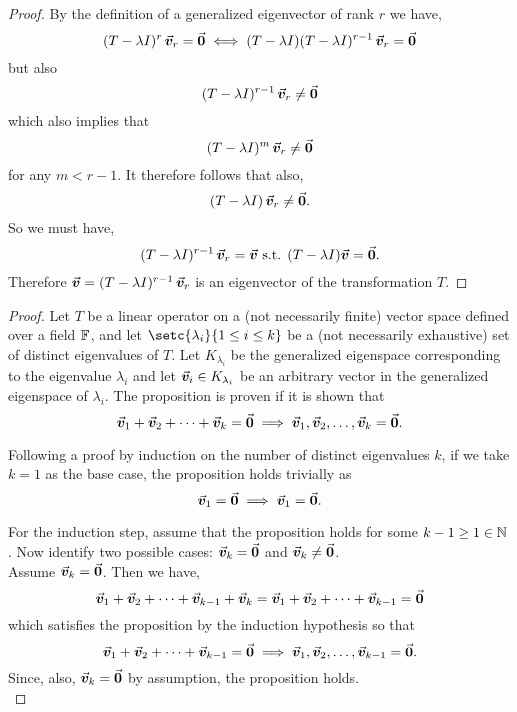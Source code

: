 \documentclass[../MathsNotesBase.tex]{subfiles}
\begin{document}
{		\bigskip
		\begin{proof}
			By the definition of a generalized eigenvector of rank $r$ we have,
			\[ (T - \lambda I)^r \, \vec{\bm{v}}_r = \vec{\bm{0}} \iff (T - \lambda I)(T - \lambda I)^{r-1} \, \vec{\bm{v}}_r = \vec{\bm{0}} \]
			but also
			\[ (T - \lambda I)^{r-1} \, \vec{\bm{v}}_r \neq \vec{\bm{0}} \]
			which also implies that
			\[ (T - \lambda I)^m \, \vec{\bm{v}}_r \neq \vec{\bm{0}} \]
			for any ${ m < r-1 }$. It therefore follows that also,
			\[ (T - \lambda I) \, \vec{\bm{v}}_r \neq \vec{\bm{0}}. \]
			So we must have,
			\[ (T - \lambda I)^{r-1} \, \vec{\bm{v}}_r = \vec{\bm{v}} \text{ s.t. } (T - \lambda I)\vec{\bm{v}} = \vec{\bm{0}}. \]
			Therefore ${ \vec{\bm{v}} = (T - \lambda I)^{r-1} \, \vec{\bm{v}}_r }$ is an eigenvector of the transformation $T$.
		\end{proof}
	
		\bigskip
		\begin{proof}
			Let $T$ be a linear operator on a (not necessarily finite) vector space defined over a field $\mathbb{F}^{}$, and let ${ \setc{\lambda_i}{1 \leq i \leq k} }$ be a (not necessarily exhaustive) set of distinct eigenvalues of $T$. Let $K_{\lambda_i}$ be the generalized eigenspace corresponding to the eigenvalue $\lambda_i$ and let ${ \vec{\bm{v}}_i \in K_{\lambda_i} }$ be an arbitrary vector in the generalized eigenspace of $\lambda_i$. The proposition is proven if it is shown that
			\[ \vec{\bm{v}}_1 + \vec{\bm{v}}_2 + \cdots + \vec{\bm{v}}_k = \vec{\bm{0}} \implies \vec{\bm{v}}_1, \vec{\bm{v}}_2, \dots, \vec{\bm{v}}_k = \vec{\bm{0}}. \]
			
			Following a proof by induction on the number of distinct eigenvalues $k$, if we take ${ k = 1 }$ as the base case, the proposition holds trivially as
			\[ \vec{\bm{v}}_1 = \vec{\bm{0}} \implies \vec{\bm{v}}_1 = \vec{\bm{0}}. \]
			
			\nl[2]
			For the induction step, assume that the proposition holds for some ${ k - 1 \geq 1 \in \mathbb{N}^{} }$. Now identify two possible cases: ${ \vec{\bm{v}}_k = \vec{\bm{0}} }$ and ${ \vec{\bm{v}}_k \neq \vec{\bm{0}} }$.\\
			
			\nl[2]
			Assume ${ \vec{\bm{v}}_k = \vec{\bm{0}} }$. Then we have,
			\[ \vec{\bm{v}}_1 + \vec{\bm{v}}_2 + \cdots + \vec{\bm{v}}_{k-1} + \vec{\bm{v}}_k = \vec{\bm{v}}_1 + \vec{\bm{v}}_2 + \cdots + \vec{\bm{v}}_{k-1} = \vec{\bm{0}} \]
			which satisfies the proposition by the induction hypothesis so that
			\[ \vec{\bm{v}}_1 + \vec{\bm{v}}_2 + \cdots + \vec{\bm{v}}_{k-1} = \vec{\bm{0}} \implies \vec{\bm{v}}_1, \vec{\bm{v}}_2, \dots, \vec{\bm{v}}_{k-1} = \vec{\bm{0}}. \]
			Since, also, ${ \vec{\bm{v}}_k = \vec{\bm{0}} }$ by assumption, the proposition holds.\\
			

\end{proof}}
\end{document}

